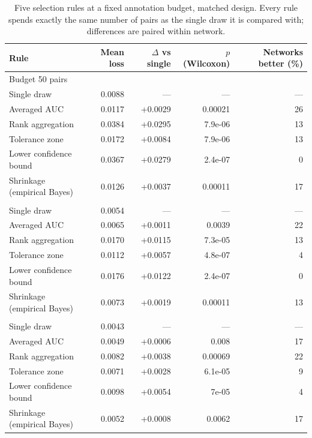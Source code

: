 \begin{table}[htbp]
\centering
\scriptsize
\setlength{\tabcolsep}{4pt}
\caption{Five selection rules at a fixed annotation budget, matched design. Every rule spends exactly the same number of pairs as the single draw it is compared with; differences are paired within network.}
\label{tab:rules}
\begin{tabular}{l r r r r}
\toprule
Rule & Mean loss & $\Delta$ vs single & $p$ (Wilcoxon) & Networks better (\%) \\
\midrule
\multicolumn{5}{l}{Budget 50 pairs} \\
\quad Single draw & 0.0088 & --- & --- & --- \\
\quad Averaged AUC & 0.0117 & +0.0029 & 0.00021 & 26 \\
\quad Rank aggregation & 0.0384 & +0.0295 & 7.9e-06 & 13 \\
\quad Tolerance zone & 0.0172 & +0.0084 & 7.9e-06 & 13 \\
\quad Lower confidence bound & 0.0367 & +0.0279 & 2.4e-07 & 0 \\
\quad Shrinkage (empirical Bayes) & 0.0126 & +0.0037 & 0.00011 & 17 \\
\addlinespace[2pt]
\multicolumn{5}{l}{Budget 100 pairs} \\
\quad Single draw & 0.0054 & --- & --- & --- \\
\quad Averaged AUC & 0.0065 & +0.0011 & 0.0039 & 22 \\
\quad Rank aggregation & 0.0170 & +0.0115 & 7.3e-05 & 13 \\
\quad Tolerance zone & 0.0112 & +0.0057 & 4.8e-07 & 4 \\
\quad Lower confidence bound & 0.0176 & +0.0122 & 2.4e-07 & 0 \\
\quad Shrinkage (empirical Bayes) & 0.0073 & +0.0019 & 0.00011 & 13 \\
\addlinespace[2pt]
\multicolumn{5}{l}{Budget 200 pairs} \\
\quad Single draw & 0.0043 & --- & --- & --- \\
\quad Averaged AUC & 0.0049 & +0.0006 & 0.008 & 17 \\
\quad Rank aggregation & 0.0082 & +0.0038 & 0.00069 & 22 \\
\quad Tolerance zone & 0.0071 & +0.0028 & 6.1e-05 & 9 \\
\quad Lower confidence bound & 0.0098 & +0.0054 & 7e-05 & 4 \\
\quad Shrinkage (empirical Bayes) & 0.0052 & +0.0008 & 0.0062 & 17 \\

\end{tabular}
\end{table}
